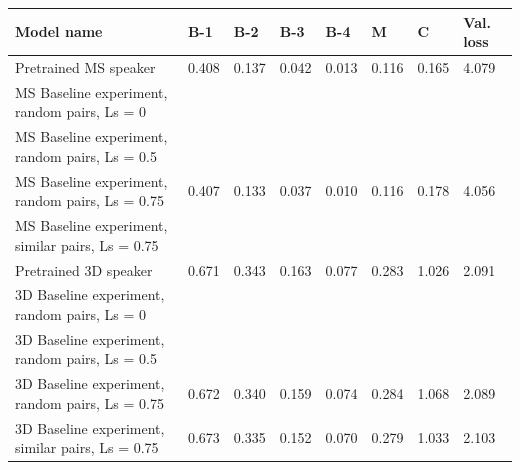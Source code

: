 \begin{table}[]
	\begin{tabularx}{\textwidth}{|X|l|l|l|l|l|l|l|}
		\hline
		\textbf{Model name}                                    & \textbf{B-1} & \textbf{B-2} & \textbf{B-3} & \textbf{B-4} & \textbf{M} & \textbf{C} & \textbf{Val. loss} \\ \hline
		Pretrained MS speaker                             & 0.408           & 0.137           & 0.042           & 0.013           & 0.116           & 0.165          & 4.079                    \\ \hline
		MS Baseline experiment, random pairs, Ls = 0      &                 &                 &                 &                 &                 &                &                          \\ \hline
		MS Baseline experiment, random pairs, Ls = 0.5    &                 &                 &                 &                 &                 &                &                          \\ \hline
		MS Baseline experiment, random pairs, Ls = 0.75   & 0.407           & 0.133           & 0.037           & 0.010           & 0.116           & 0.178          & 4.056                    \\ \hline
		MS Baseline experiment, similar pairs, Ls = 0.75  &                 &                 &                 &                 &                 &                &                          \\ \hline
		Pretrained 3D speaker                            & 0.671           & 0.343           & 0.163           & 0.077           & 0.283           & 1.026          & 2.091                    \\ \hline
		3D Baseline experiment, random pairs, Ls = 0     &                 &                 &                 &                 &                 &                &                          \\ \hline
		3D Baseline experiment, random pairs, Ls = 0.5   &                 &                 &                 &                 &                 &                &                          \\ \hline
		3D Baseline experiment, random pairs, Ls = 0.75  & 0.672           & 0.340           & 0.159           & 0.074           & 0.284           & 1.068          & 2.089                    \\ \hline
		3D Baseline experiment, similar pairs, Ls = 0.75 & 0.673           & 0.335           & 0.152           & 0.070           & 0.279           & 1.033          & 2.103                    \\ \hline

\end{tabularx}
\end{table}
